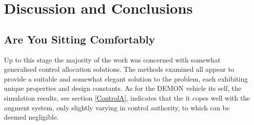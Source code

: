 \chapter{Discussion and Conclusions}

\section{Are You Sitting Comfortably}

Up to this stage the majority of the work was concerned with somewhat generalised control allocation solutions. The methods examined all appear to provide a suitable and somewhat elegant solution to the problem, each exhibiting unique properties and design constants. As for the DEMON vehicle its self, the simulation results, see section \ref{ControlA}, indicates that the it copes well with the augment system, only slightly varying in control authority, to which can be deemed negligible.